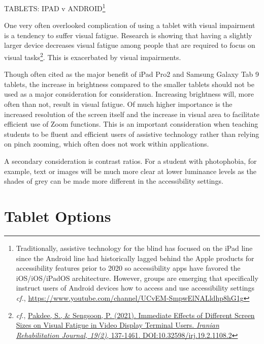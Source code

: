 \documentclass[14pt,letterpaper,twoside]{extreport}
\begin{document}
TABLETS: IPAD v ANDROID\footnote{Traditionally, assistive technology for the blind has focused on the iPad line since the Android line had historically lagged behind the Apple products for accessibility features prior to 2020 so accessibility apps have favored the iOS/iOS/iPadOS architecture. However, groups are emerging that specifically instruct users of Android devices how to access and use accessibility settings \textit{cf.}, \href{Blind Android Users}{https://www.youtube.com/channel/UCvEM-SmpwElNALldhp8hG1g}}

One very often overlooked complication of using a tablet with visual impairment is a tendency to suffer visual fatigue. Research is showing that having a slightly larger device decreases visual fatigue among people that are required to focus on visual tasks\footnote{\textit{cf}., \href{https://www.researchgate.net/publication/352764109_Immediate_Effects_of_Different_Screen_Sizes_on_Visual_Fatigue_in_Video_Display_Terminal_Users}{Pakdee, S., \& Sengsoon, P. (2021). Immediate Effects of Different Screen Sizes on Visual Fatigue in Video Display Terminal Users. \textit{Iranian Rehabilitation Journal, 19(2)}, 137-1461. DOI:10.32598/irj.19.2.1108.2} }. This is exacerbated by visual impairments. 

Though often cited as the major benefit of iPad Pro2 and Samsung Galaxy Tab 9 tablets, the increase in brightness compared to the smaller tablets should not be used as a major consideration for consideration. Increasing brightness will, more often than not, result in visual fatigue. Of much higher importance is the increased resolution of the screen itself and the increase in visual area to facilitate efficient use of Zoom functions. This is an important consideration when teaching students to be fluent and efficient users of assistive technology rather than relying on pinch zooming, which often does not work within applications. 

A secondary consideration is contrast ratios. For a student with photophobia, for example, text or images will be much more clear at lower luminance levels as the shades of grey can be made more different in the accessibility settings. 

\hypertarget{tablet-options}{%
	\section{Tablet Options}\label{tablet-options}}
\end{document}
